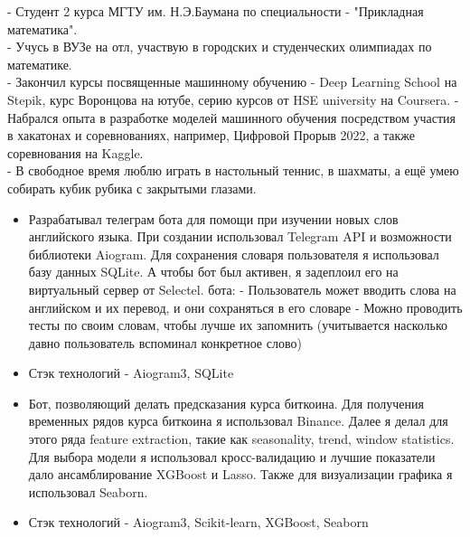 \documentclass[10pt,a4paper,ragged2e,withhyper]{altacv}
\begin{document}
\begin{paracol}{2}

- Студент 2 курса МГТУ им. Н.Э.Баумана по специальности - "Прикладная математика".\\
- Учусь в ВУЗе на отл, участвую в городских и студенческих олимпиадах по математике.\\
- Закончил курсы посвященные машинному обучению - Deep Learning School на Stepik, курс Воронцова на ютубе, серию курсов от HSE university на Coursera. \newline
- Набрался опыта в разработке моделей машинного обучения посредством участия в хакатонах и соревнованиях, например, Цифровой Прорыв 2022, а также соревнования на Kaggle.\\
- В свободное время люблю играть в настольный теннис, в шахматы, а ещё умею собирать кубик рубика с закрытыми глазами.


\begin{itemize}
\item Разрабатывал телеграм бота для помощи при изучении новых слов английского языка. При создании использовал Telegram API и возможности библиотеки Aiogram. Для сохранения словаря пользователя я использовал базу данных SQLite. А чтобы бот был активен, я задеплоил его на виртуальный сервер от Selectel.
 бота:
\newline- Пользователь может вводить слова на английском и их перевод, и они сохраняться в его словаре
\newline- Можно проводить тесты по своим словам, чтобы лучше их запомнить (учитывается насколько давно пользователь вспоминал конкретное слово)
\item Стэк технологий - Aiogram3, SQLite
\end{itemize}


\begin{itemize}
\item Бот, позволяющий делать предсказания курса биткоина. Для получения временных рядов курса биткоина я использовал Binance. Далее я делал для этого ряда feature extraction, такие как seasonality, trend, window statistics. Для выбора модели я использовал кросс-валидацию и лучшие показатели дало ансамблирование XGBoost и Lasso. Также для визуализации графика я использовал Seaborn.
\item Стэк технологий - Aiogram3, Scikit-learn, XGBoost, Seaborn
\end{itemize}



\end{paracol}
\end{document}
